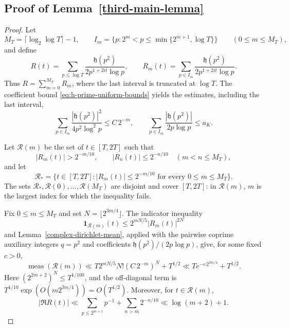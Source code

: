 \documentclass[twoside,reqno,11pt,a4paper]{amsart}
\numberwithin{equation}{section}
\theoremstyle{plain}
\theoremstyle{definition}
\theoremstyle{remark}
\renewcommand{\le}{\leqslant}
\begin{document}
\subsection{Proof of Lemma~\ref{third-main-lemma}}

\begin{proof}
Let
\begin{equation*}
 M_T=\lceil\log_2\log T\rceil-1,
 \qquad I_m=\{p:2^m<p\le\min\{2^{m+1},\log T\}\}
 \qquad(0\le m\le M_T),
\end{equation*}
and define
\begin{equation*}
 R(t)=\sum_{p\le\log T}\frac{\mathfrak h(p^2)}{2p^{1+2it}\log p},
 \qquad R_m(t)=\sum_{p\in I_m}\frac{\mathfrak h(p^2)}{2p^{1+2it}\log p}.
\end{equation*}
Thus $R=\sum_{m=0}^{M_T}R_m$, where the last interval is truncated at $\log T$.
The coefficient bound \eqref{eq:h-prime-uniform-bounds} yields the estimates, including the last interval,
\begin{equation}\label{eq:square-block-norms}
 \sum_{p\in I_m}\frac{|\mathfrak h(p^2)|^2}{4p^2\log^2p}
 \le C\,2^{-m},
 \qquad
 \sum_{p\in I_m}\frac{|\mathfrak h(p^2)|}{2p\log p}\le a_K.
\end{equation}

Let $\mathcal R(m)$ be the set of $t\in[T,2T]$ such that
\begin{equation*}
 |R_m(t)|>2^{-m/10},\qquad |R_n(t)|\le2^{-n/10}\quad(m<n\le M_T),
\end{equation*}
and let
\begin{equation*}
 \mathcal R_*=\{t\in[T,2T]:|R_m(t)|\le2^{-m/10}
 \text{ for every }0\le m\le M_T\}.
\end{equation*}
The sets $\mathcal R_*,\mathcal R(0),\ldots,\mathcal R(M_T)$ are disjoint
and cover $[T,2T]$: in $\mathcal R(m)$, $m$ is the largest index for which the inequality fails.

Fix $0\le m\le M_T$ and set $N=\lfloor2^{3m/4}\rfloor$.  The indicator inequality
\begin{equation}\label{eq:square-block-indicator}
 \mathbf1_{\mathcal R(m)}(t)
 \le2^{mN/5}|R_m(t)|^{2N}
\end{equation}
and Lemma~\ref{complex-dirichlet-mean}, applied with the pairwise coprime
auxiliary integers $q=p^2$ and coefficients
$\mathfrak h(p^2)/(2p\log p)$, give, for some fixed $c>0$,
\begin{equation}\label{eq:square-block-measure}
 \operatorname{meas}(\mathcal R(m))
 \ll T2^{mN/5}N!(C\,2^{-m})^N+T^{1/2}
 \ll T e^{-c\,2^{3m/4}}+T^{1/2}.
\end{equation}
Here $(2^{2m+2})^N\le T^{1/100}$, and the off-diagonal term is
$T^{1/10}\exp(O(m2^{3m/4}))=O(T^{1/2})$.  Moreover, for $t\in\mathcal R(m)$,
\begin{equation}\label{eq:square-block-pointwise}
 |\Re R(t)|\ll\sum_{p\le2^{m+1}}p^{-1}
 +\sum_{n>m}2^{-n/10}\ll\log(m+2)+1.
\end{equation}


\end{proof}
\end{document}
